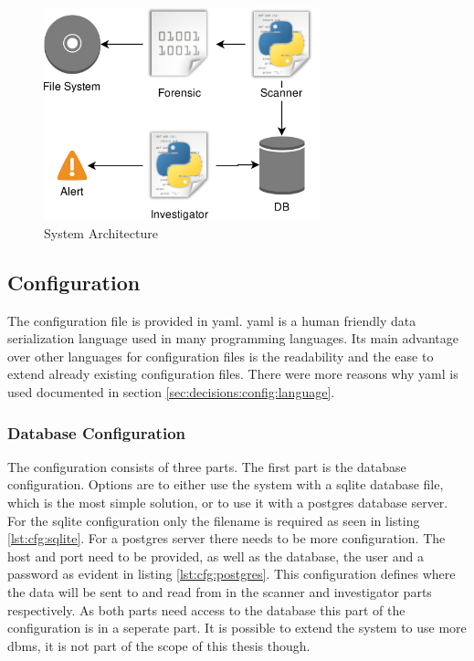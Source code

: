 \documentclass[
	a4paper,					%
	10pt,							%
	twoside,					%
	openright,				%
	notitlepage,			%
	parskip=half,			%
]{scrreprt}					%
\begin{document}
\begin{figure}[ht]
  \includegraphics[width=8cm]{../img/Overview_FIDS.png}
  \centering
  \caption{System Architecture}
  \label{fig:systemArchitecture}
\end{figure}

\subsection{Configuration}
\label{sec:Configuration}

The configuration file is provided in \gls{yaml}. \gls{yaml} is a human friendly data serialization language used in many programming languages. Its main advantage over other languages for configuration files is the readability and the ease to extend already existing configuration files. There were more reasons why \gls{yaml} is used documented in section \ref{sec:decisions:config:language}.

\subsubsection{Database Configuration}

The configuration consists of three parts. The first part is the database configuration. Options are to either use the system with a \gls{sqlite} database file, which is the most simple solution, or to use it with a \gls{postgres} database server. For the sqlite configuration only the filename is required as seen in listing \ref{lst:cfg:sqlite}. For a postgres server there needs to be more configuration. The host and port need to be provided, as well as the database, the user and a password as evident in listing \ref{lst:cfg:postgres}. This configuration defines where the data will be sent to and read from in the scanner and investigator parts respectively. As both parts need access to the database this part of the configuration is in a seperate part. It is possible to extend the system to use more \gls{dbms}, it is not part of the scope of this thesis though.
\end{document}
